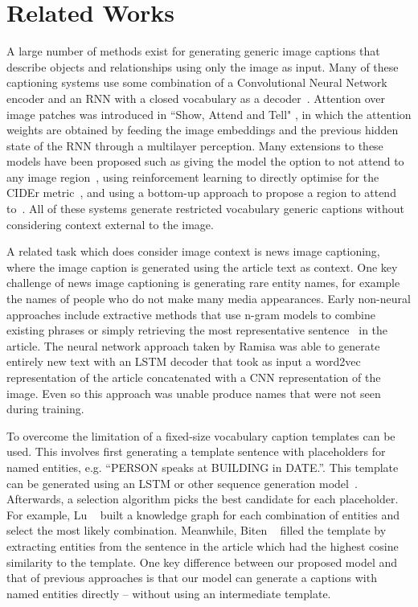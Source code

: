 
\section{Related Works}

A large number of methods exist for generating generic image captions that
describe objects and relationships using only the image as input. Many of these
captioning systems use some combination of a Convolutional Neural Network
encoder and an RNN with a closed
vocabulary as a decoder~\cite{Karpathy2015DeepVA, Donahue2015LongTR,
Vinyals2015ShowAT}.
Attention over image patches was introduced in ``Show, Attend and Tell"
\cite{Xu2015ShowAA}, in which the attention weights are obtained by feeding the
image embeddings and the previous hidden state of the RNN through a multilayer
perception. Many extensions to these models have been proposed such as giving
the model the option to not
attend to any image region~\cite{Lu2017KnowingWT}, using reinforcement learning
to directly optimise for the CIDEr metric~\cite{Rennie2017SelfCriticalST,
Gao2019DeliberateAN}, and using a bottom-up approach to propose a region to
attend to~\cite{Anderson2017BottomUpAT}. All of these systems generate
restricted vocabulary generic captions without considering context external to
the image.

A related task which does consider image context is news image captioning,
where the image caption is generated using the article text as context.
One key challenge of news image captioning is generating rare entity names, for
example the names of people who do not make many media appearances. Early
non-neural approaches include
extractive methods that use n-gram models to combine existing phrases
\cite{Feng2013AutomaticCG} or simply retrieving the most representative
sentence~\cite{Tariq2017ACE} in the article. The neural network approach taken
by Ramisa \etal
\cite{Ramisa2016BreakingNewsAA} was able to generate entirely new text with an
LSTM decoder that took as input a word2vec representation of the
article concatenated with a CNN representation of the image. Even so this
approach was unable produce names that were not seen during training.

To overcome the limitation of a fixed-size vocabulary caption templates can be
used. This involves first generating a
template sentence with placeholders for named entities, e.g. ``PERSON speaks at
BUILDING in
DATE.''. This template can be generated using an LSTM or other sequence
generation model~\cite{Biten2019GoodNews}. Afterwards, a selection algorithm
picks the best candidate
for each placeholder. For example, Lu \etal~\cite{Lu2018EntityAI} built a
knowledge graph
for each combination of entities and select the most likely combination.
Meanwhile, Biten \etal~\cite{Biten2019GoodNews} filled the template by
extracting entities from the sentence in the article which had the highest
cosine similarity to
the template. One key difference between our proposed model and that of
previous approaches\cite{Biten2019GoodNews,Lu2018EntityAI} is that our model can
generate a captions with named entities directly -- without using an
intermediate template.

